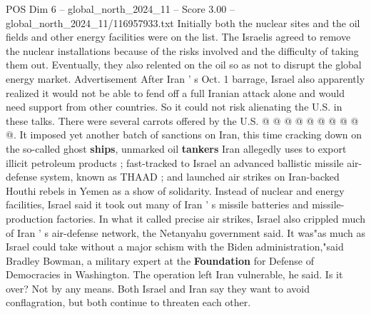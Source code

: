 \begin{textsample}{POS Dim 6 – global\_north\_2024\_11 – Score 3.00 – global\_north\_2024\_11/116957933.txt}
Initially both the nuclear sites and the oil fields and other energy facilities were on the list.
The Israelis agreed to remove the nuclear installations because of the risks involved and the difficulty of taking them out.
Eventually, they also relented on the oil so as not to disrupt the global energy market.
Advertisement After Iran ' s Oct. 1 barrage, Israel also apparently realized it would not be able to fend off a full Iranian attack alone and would need support from other countries.
So it could not risk alienating the U.S. in these talks.
There were several carrots offered by the U.S. @ @ @ @ @ @ @ @ @ @.
It imposed yet another batch of sanctions on Iran, this time cracking down on the so-called ghost \textbf{ships}, unmarked oil \textbf{tankers} Iran allegedly uses to export illicit petroleum products ; fast-tracked to Israel an advanced ballistic missile air-defense system, known as THAAD ; and launched air strikes on Iran-backed Houthi rebels in Yemen as a show of solidarity.
Instead of nuclear and energy facilities, Israel said it took out many of Iran ' s missile batteries and missile-production factories.
In what it called precise air strikes, Israel also crippled much of Iran ' s air-defense network, the Netanyahu government said.
It was"as much as Israel could take without a major schism with the Biden administration,"said Bradley Bowman, a military expert at the \textbf{Foundation} for Defense of Democracies in Washington.
The operation left Iran vulnerable, he said.
Is it over?
Not by any means.
Both Israel and Iran say they want to avoid conflagration, but both continue to threaten each other.

\end{textsample}
